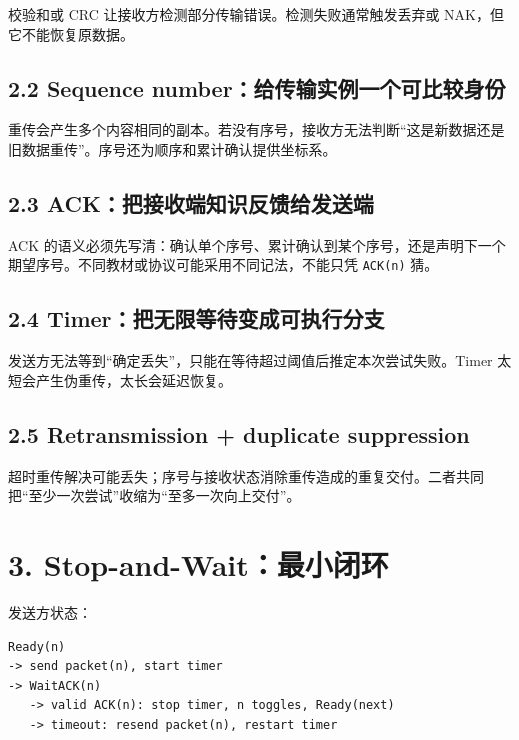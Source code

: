 \documentclass[UTF8,fontset=none,11pt,a4paper]{ctexart}
\providecommand{\passthrough}[1]{#1}
\begin{document}
校验和或 CRC 让接收方检测部分传输错误。检测失败通常触发丢弃或
NAK，但它不能恢复原数据。

\subsection{2.2 Sequence
number：给传输实例一个可比较身份}\label{22-sequence-numberux7ed9ux4f20ux8f93ux5b9eux4f8bux4e00ux4e2aux53efux6bd4ux8f83ux8eabux4efd}

重传会产生多个内容相同的副本。若没有序号，接收方无法判断``这是新数据还是旧数据重传''。序号还为顺序和累计确认提供坐标系。

\subsection{2.3
ACK：把接收端知识反馈给发送端}\label{23-ackux628aux63a5ux6536ux7aefux77e5ux8bc6ux53cdux9988ux7ed9ux53d1ux9001ux7aef}

ACK
的语义必须先写清：确认单个序号、累计确认到某个序号，还是声明下一个期望序号。不同教材或协议可能采用不同记法，不能只凭
\passthrough{\lstinline!ACK(n)!} 猜。

\subsection{2.4
Timer：把无限等待变成可执行分支}\label{24-timerux628aux65e0ux9650ux7b49ux5f85ux53d8ux6210ux53efux6267ux884cux5206ux652f}

发送方无法等到``确定丢失''，只能在等待超过阈值后推定本次尝试失败。Timer
太短会产生伪重传，太长会延迟恢复。

\subsection{2.5 Retransmission + duplicate
suppression}\label{25-retransmission--duplicate-suppression}

超时重传解决可能丢失；序号与接收状态消除重传造成的重复交付。二者共同把``至少一次尝试''收缩为``至多一次向上交付''。

\section{3.
Stop-and-Wait：最小闭环}\label{3-stop-and-waitux6700ux5c0fux95edux73af}

发送方状态：

\begin{lstlisting}
Ready(n)
-> send packet(n), start timer
-> WaitACK(n)
   -> valid ACK(n): stop timer, n toggles, Ready(next)
   -> timeout: resend packet(n), restart timer
\end{lstlisting}
\end{document}
